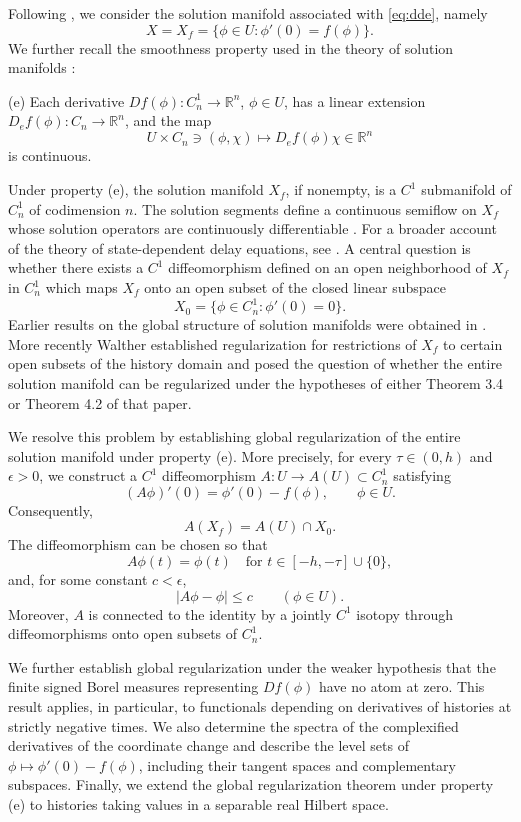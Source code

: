 \documentclass[11pt]{article}
\begin{document}
Following \cite{Walther2003,Walther2026}, we consider
the solution manifold associated with \eqref{eq:dde}, namely
\[
X=X_f=\{\phi\in U:\phi'(0)=f(\phi)\}.
\]
We further recall the
smoothness property used in the theory of solution
manifolds \cite{Walther2003,Walther2026}:

\medskip
\noindent
\textup{(e)} Each derivative
$Df(\phi):C_n^1\to\mathbb R^n$, $\phi\in U$,
has a linear extension
$D_ef(\phi):C_n\to\mathbb R^n$, and the map
\[
U\times C_n\ni(\phi,\chi)
\longmapsto D_ef(\phi)\chi\in\mathbb R^n
\]
is continuous.
\medskip

Under property \textup{(e)}, the solution manifold
$X_f$, if nonempty, is a $C^1$ submanifold of
$C_n^1$ of codimension $n$. The solution segments
define a continuous semiflow on $X_f$ whose solution
operators are continuously differentiable
\cite{Walther2003}. For a broader account of the
theory of state-dependent delay equations, see
\cite{HartungEtAl2006}. A central question is whether
there exists a $C^1$ diffeomorphism defined on an
open neighborhood of $X_f$ in $C_n^1$ which maps
$X_f$ onto an open subset of the closed linear
subspace
\[
X_0=\{\phi\in C_n^1:\phi'(0)=0\}.
\]
Earlier results on the global structure of solution
manifolds were obtained in
\cite{Walther2021,KrisztinWalther2023,Walther2025}.
More recently
Walther \cite{Walther2026} established regularization
for restrictions of $X_f$ to certain open subsets
of the history domain and posed the question of
whether the entire solution manifold can be
regularized under the hypotheses of either Theorem 3.4
or Theorem 4.2 of that paper.

We resolve this problem by establishing global
regularization of the entire solution manifold under
property \textup{(e)}. More precisely, for every
$\tau\in(0,h)$ and $\epsilon>0$, we construct a
$C^1$ diffeomorphism
$A:U\to A(U)\subset C_n^1$ satisfying
\[
(A\phi)'(0)=\phi'(0)-f(\phi),
\qquad \phi\in U.
\]
Consequently,
\[
A(X_f)=A(U)\cap X_0.
\]
The diffeomorphism can be chosen so that
\[
A\phi(t)=\phi(t)
\quad\text{for }t\in[-h,-\tau]\cup\{0\},
\]
and, for some constant $c<\epsilon$,
\[
|A\phi-\phi|\le c
\qquad(\phi\in U).
\]
Moreover, $A$ is connected to the identity by a
jointly $C^1$ isotopy through diffeomorphisms
onto open subsets of $C_n^1$.


We further establish global regularization under the
weaker hypothesis that the finite signed Borel measures
representing $Df(\phi)$ have no atom at zero.
This result applies, in particular, to
functionals depending on derivatives of histories
at strictly negative times. We also determine the
spectra of the complexified derivatives of the
coordinate change and describe the level sets of
$\phi\mapsto\phi'(0)-f(\phi)$, including their
tangent spaces and complementary subspaces.
Finally, we extend the global regularization
theorem under property \textup{(e)} to histories
taking values in a separable real Hilbert space.
\end{document}
